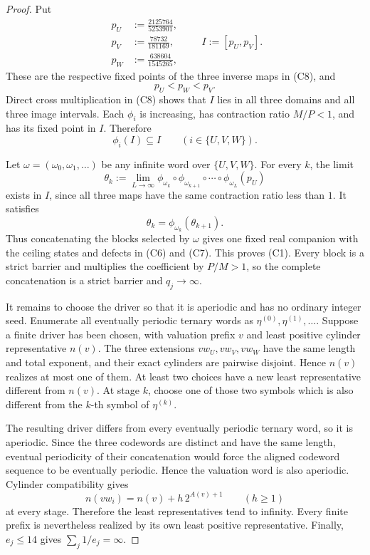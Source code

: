 \documentclass[11pt]{article}
\begin{document}
\begin{proof}
Put
\[
\begin{aligned}
  p_U&:=\frac{2125764}{5253901},\\
  p_V&:=\frac{78732}{181169},\\
  p_W&:=\frac{638604}{1545265},
\end{aligned}
\qquad
  I:=[p_U,p_V].
\tag{C10}
\]
These are the respective fixed points of the three inverse maps in (C8),
and
\[
  p_U<p_W<p_V.
\]
Direct cross multiplication in (C8) shows that $I$ lies in all three
domains and all three image intervals.  Each $\phi_i$ is increasing, has
contraction ratio $M/P<1$, and has its fixed point in $I$.  Therefore
\[
  \phi_i(I)\subseteq I
  \qquad(i\in\{U,V,W\}).
  \tag{C11}
\]

Let $\omega=(\omega_0,\omega_1,\ldots)$ be any infinite word over
$\{U,V,W\}$.  For every $k$, the limit
\[
  \theta_k
  :=\lim_{L\to\infty}
  \phi_{\omega_k}\circ\phi_{\omega_{k+1}}\circ\cdots
  \circ\phi_{\omega_L}(p_U)
  \tag{C12}
\]
exists in $I$, since all three maps have the same contraction ratio less
than $1$.  It satisfies
\[
  \theta_k=\phi_{\omega_k}(\theta_{k+1}).
\]
Thus concatenating the blocks selected by $\omega$ gives one fixed real
companion with the ceiling states and defects in (C6) and (C7).  This proves
(C1).  Every block is a strict barrier and multiplies the coefficient by
$P/M>1$, so the complete concatenation is a strict barrier and $q_j\to
\infty$.

It remains to choose the driver so that it is aperiodic and has no ordinary
integer seed.  Enumerate all eventually periodic ternary words as
$\eta^{(0)},\eta^{(1)},\ldots$.  Suppose a finite driver has been chosen,
with valuation prefix $v$ and least positive cylinder representative
$n(v)$.  The three extensions $vw_U,vw_V,vw_W$ have the same length and
total exponent, and their exact cylinders are pairwise disjoint.  Hence
$n(v)$ realizes at most one of them.  At least two choices have a new least
representative different from $n(v)$.  At stage $k$, choose one of those
two symbols which is also different from the $k$-th symbol of
$\eta^{(k)}$.

The resulting driver differs from every eventually periodic ternary word,
so it is aperiodic.  Since the three codewords are distinct and have the
same length, eventual periodicity of their concatenation would force the
aligned codeword sequence to be eventually periodic.  Hence the valuation
word is also aperiodic.  Cylinder compatibility gives
\[
  n(vw_i)=n(v)+h\,2^{A(v)+1}
  \qquad(h\geq1)
  \tag{C13}
\]
at every stage.  Therefore the least representatives tend to infinity.
Every finite prefix is nevertheless realized by its own least positive
representative.  Finally, $e_j\leq14$ gives
$\sum_j1/e_j=\infty$.
\end{proof}
\end{document}
